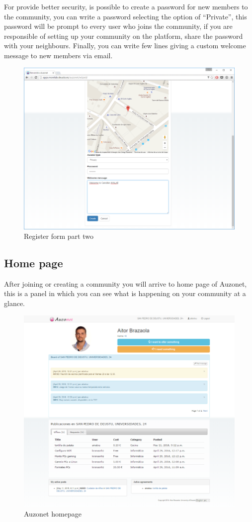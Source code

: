 \documentclass{DeustoFDP}
\begin{document}
For provide better security, is possible to create a password for new members to the community, you can write a password selecting the option of “Private”, this password will be prompt to every user who joins the community, if you are responsible of setting up your community on the platform, share the password with your neighbours.
Finally, you can write few lines giving a custom welcome message to new members via email.
\begin{figure}[h!]
\centering
\includegraphics[width=0.9\linewidth]{fig/Manual/address2}
\caption[Register form part two]{Register form part two}
\label{fig:address2}
\end{figure}

\newpage
\subsection{Home page}
After joining or creating a community you will arrive to home page of Auzonet, this is a panel in which you can see what is happening on your community at a glance.
\begin{figure}[h!]
\centering
\includegraphics[width=0.9\linewidth]{fig/Manual/home}
\caption[Auzonet homepage]{Auzonet homepage}
\label{fig:home}
\end{figure}
\end{document}
